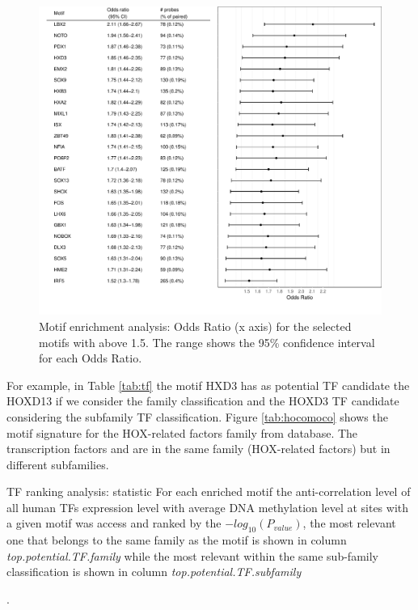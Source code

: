 \begin{center}
\begin{figure}[h!]
\includegraphics[width=16cm]{images/hyper_motif_enrichment.pdf}
\caption[G-CIMP analysis: Odds Ratio plot]{Motif enrichment analysis: Odds Ratio (x axis) for the selected motifs with  above 1.5. The range shows the 95\% confidence interval for each Odds Ratio.}
\end{figure}
\label{tab:or}
\end{center}


For example, in Table \ref{tab:tf} the motif HXD3 has as potential TF candidate the HOXD13 if we consider the family  classification and the HOXD3 TF candidate considering the subfamily TF classification. Figure \ref{tab:hocomoco} shows the motif signature for the HOX-related factors family from  database. The transcription factors  and  are in the same family (HOX-related factors) but in different subfamilies.



\begin{table}[h!]
\centering
\caption[G-CIMP analysis: TF ranking plot]{TF ranking analysis: statistic For each enriched motif the anti-correlation level of all human TFs expression level with average DNA methylation level at sites with a given motif was access and ranked by the $-log_{10}(P_{value})$, the most relevant one that belongs to the same family as the motif is shown in column \textit{top.potential.TF.family} while the most relevant within the same sub-family classification is shown in column \textit{top.potential.TF.subfamily}}.
\label{tab:tf}
\end{table}

